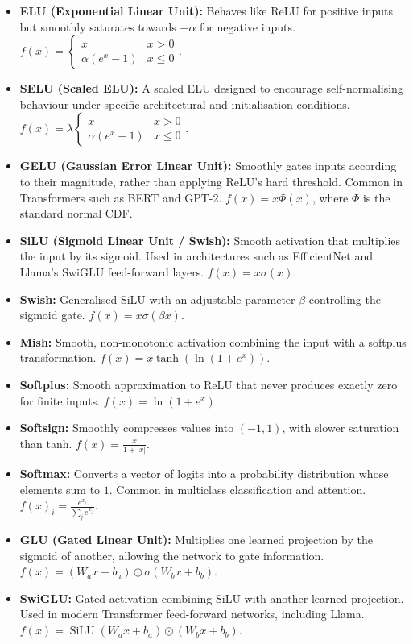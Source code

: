 \begin{itemize}
    \item \textbf{ELU (Exponential Linear Unit):} Behaves like ReLU for positive inputs but smoothly saturates towards $-\alpha$ for negative inputs. $f(x)=\begin{cases}x & x>0\\\alpha(e^x-1) & x\leq0\end{cases}$.

    \item \textbf{SELU (Scaled ELU):} A scaled ELU designed to encourage self-normalising behaviour under specific architectural and initialisation conditions. $f(x)=\lambda\begin{cases}x & x>0\\\alpha(e^x-1) & x\leq0\end{cases}$.

    \item \textbf{GELU (Gaussian Error Linear Unit):} Smoothly gates inputs according to their magnitude, rather than applying ReLU's hard threshold. Common in Transformers such as BERT and GPT-2. $f(x)=x\Phi(x)$, where $\Phi$ is the standard normal CDF.

    \item \textbf{SiLU (Sigmoid Linear Unit / Swish):} Smooth activation that multiplies the input by its sigmoid. Used in architectures such as EfficientNet and Llama's SwiGLU feed-forward layers. $f(x)=x\sigma(x)$.

    \item \textbf{Swish:} Generalised SiLU with an adjustable parameter $\beta$ controlling the sigmoid gate. $f(x)=x\sigma(\beta x)$.

    \item \textbf{Mish:} Smooth, non-monotonic activation combining the input with a softplus transformation. $f(x)=x\tanh(\ln(1+e^x))$.

    \item \textbf{Softplus:} Smooth approximation to ReLU that never produces exactly zero for finite inputs. $f(x)=\ln(1+e^x)$.

    \item \textbf{Softsign:} Smoothly compresses values into $(-1,1)$, with slower saturation than tanh. $f(x)=\frac{x}{1+|x|}$.

    \item \textbf{Softmax:} Converts a vector of logits into a probability distribution whose elements sum to $1$. Common in multiclass classification and attention. $f(x)_i=\frac{e^{x_i}}{\sum_j e^{x_j}}$.

    \item \textbf{GLU (Gated Linear Unit):} Multiplies one learned projection by the sigmoid of another, allowing the network to gate information. $f(x)= (W_a x+b_a)\odot\sigma(W_b x+b_b)$.

    \item \textbf{SwiGLU:} Gated activation combining SiLU with another learned projection. Used in modern Transformer feed-forward networks, including Llama. $f(x)=\operatorname{SiLU}(W_a x+b_a)\odot(W_b x+b_b)$.
\end{itemize}


